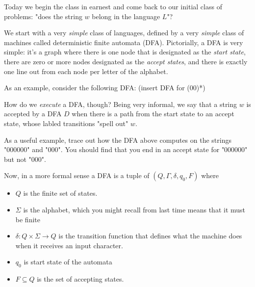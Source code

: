 \documentclass[11pt]{article}
\begin{document}
Today we begin the class in earnest and come back to our initial class of problems: "does the string $w$ belong in the language $L$"?

We start with a very \emph{simple} class of languages, defined by a very \emph{simple} class of machines called deterministic finite automata (DFA). Pictorially, a DFA is very simple: it's a graph where there is one node that is designated as the \emph{start state}, there are zero or more nodes designated as the \emph{accept states}, and there is exactly one line out from each node per letter of the alphabet.

As an example, consider the following DFA: (insert DFA for (00)*)

How do we \emph{execute} a DFA, though? Being very informal, we say that a string $w$ is accepted by a DFA $D$ when there is a path from the start state to an accept state, whose labled transitions "spell out" $w$.

As a useful example, trace out how the DFA above computes on the strings "000000" and "000". You should find that you end in an accept state for "000000" but not "000". 

Now, in a more formal sense a DFA is a tuple of $(Q,\Gamma,\delta,q_0,F)$ where 
\begin{itemize}
\item $Q$ is the finite set of states.
\item $\Sigma$ is the alphabet, which you might recall from last time means that it must be finite
\item $\delta : Q \times \Sigma \to Q$ is the transition function that defines what the machine does when it receives an input character.
\item $q_0$ is start state of the automata
\item $F \subseteq Q$ is the set of accepting states.
\end{itemize}
\end{document}
